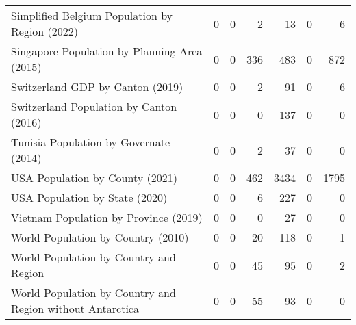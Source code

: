 \begin{tabular}{lrrr|rrr}
Simplified Belgium Population by Region (2022) & 0 & 0 & 2 & 13 & 0 & 6 \\
Singapore Population by Planning Area (2015) & 0 & 0 & 336 & 483 & 0 & 872 \\
Switzerland GDP by Canton (2019) & 0 & 0 & 2 & 91 & 0 & 6 \\
Switzerland Population by Canton (2016) & 0 & 0 & 0 & 137 & 0 & 0 \\
Tunisia Population by Governate (2014) & 0 & 0 & 2 & 37 & 0 & 0 \\
USA Population by County (2021) & 0 & 0 & 462 & 3434 & 0 & 1795 \\
USA Population by State (2020) & 0 & 0 & 6 & 227 & 0 & 0 \\
Vietnam Population by Province (2019) & 0 & 0 & 0 & 27 & 0 & 0 \\
World Population by Country (2010) & 0 & 0 & 20 & 118 & 0 & 1 \\
World Population by Country and Region & 0 & 0 & 45 & 95 & 0 & 2 \\
World Population by Country and Region without Antarctica & 0 & 0 & 55 & 93 & 0 & 0 \\
\bottomrule
\end{tabular}
